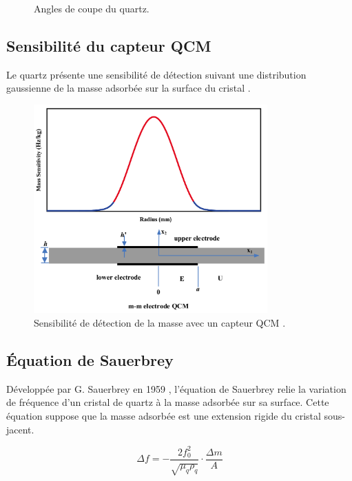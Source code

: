 \begin{figure}[H]
\begin{minipage}[t]{0.48\textwidth}
        \caption{Angles de coupe du quartz.}
        \label{fig:cut_angles}
    \end{minipage}
\end{figure}

\subsection{Sensibilité du capteur QCM}

Le quartz présente une sensibilité de détection suivant une distribution gaussienne de la masse adsorbée sur la surface du cristal \cite{s22145112}.

\begin{figure}[H]
    \centering
    \includegraphics[width=0.8\textwidth]{assets/figures/MassSensitvity.png}
    \caption{Sensibilité de détection de la masse avec un capteur QCM \cite{Huang2022}.}
    \label{fig:mass_sensitivity}
\end{figure}

\subsection{Équation de Sauerbrey}

Développée par G. Sauerbrey en 1959 \cite{sauerbrey1959}, l’équation de Sauerbrey relie la variation de fréquence d’un cristal de quartz à la masse adsorbée sur sa surface.  
Cette équation suppose que la masse adsorbée est une extension rigide du cristal sous-jacent.

\begin{equation}
    \Delta f = -\frac{2f_0^2}{\sqrt{\mu_q \rho_q}} \cdot \frac{\Delta m}{A}
\end{equation}

